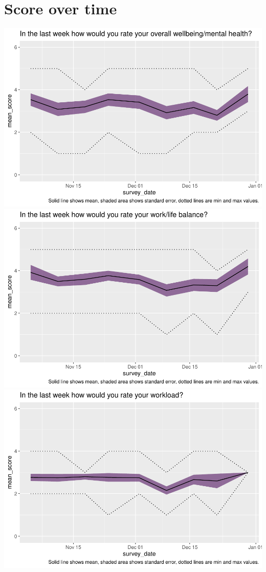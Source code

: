 \documentclass[
  10pt,
]{article}
\begin{document}
\hypertarget{score-over-time}{%
\section{Score over time}\label{score-over-time}}

\includegraphics{../pdf/Report_files/figure-latex/likert-1.pdf}
\includegraphics{../pdf/Report_files/figure-latex/likert-2.pdf}
\includegraphics{../pdf/Report_files/figure-latex/likert-3.pdf}
\end{document}
